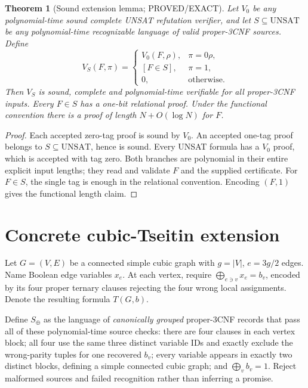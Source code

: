 \documentclass[11pt]{article}
\newtheorem{theorem}{Theorem}
\begin{document}
\begin{theorem}[Sound extension lemma; PROVED/EXACT]
Let $V_0$ be any polynomial-time sound complete UNSAT refutation
verifier, and let $S\subseteq\mathrm{UNSAT}$ be any polynomial-time
recognizable language of valid proper-3CNF sources. Define
\[
V_S(F,\pi)=
\begin{cases}
V_0(F,\rho),&\pi=0\rho,\\
[F\in S],&\pi=1,\\
0,&\text{otherwise}.
\end{cases}
\]
Then $V_S$ is sound, complete and polynomial-time verifiable for
\emph{all} proper-3CNF inputs. Every $F\in S$ has a one-bit
relational proof. Under the functional convention there is a proof
of length $N+O(\log N)$ for $F$.
\end{theorem}
\begin{proof}
Each accepted zero-tag proof is sound by $V_0$. An accepted
one-tag proof belongs to $S\subseteq\mathrm{UNSAT}$, hence is sound.
Every UNSAT formula has a $V_0$ proof, which is accepted with
tag zero. Both branches are polynomial in their entire explicit
input lengths; they read and validate $F$ and the supplied
certificate. For $F\in S$, the single tag is enough in the
relational convention. Encoding $(F,1)$ gives the functional
length claim.
\end{proof}

\section{Concrete cubic-Tseitin extension}
Let $G=(V,E)$ be a connected simple cubic graph with $g=|V|$,
$e=3g/2$ edges. Name Boolean edge variables $x_e$. At each vertex,
require $\bigoplus_{e\ni v}x_e=b_v$, encoded by its four proper
ternary clauses rejecting the four wrong local assignments.
Denote the resulting formula $T(G,b)$.

Define $S_{\oplus}$ as the language of \emph{canonically grouped}
proper-3CNF records that pass all of these polynomial-time
source checks: there are four clauses in each vertex block;
all four use the same three distinct variable IDs and exactly
exclude the wrong-parity tuples for one recovered $b_v$;
every variable appears in exactly two distinct blocks, defining
a simple connected cubic graph; and
$\bigoplus_v b_v=1$. Reject malformed sources and
failed recognition rather than inferring a promise.
\end{document}
